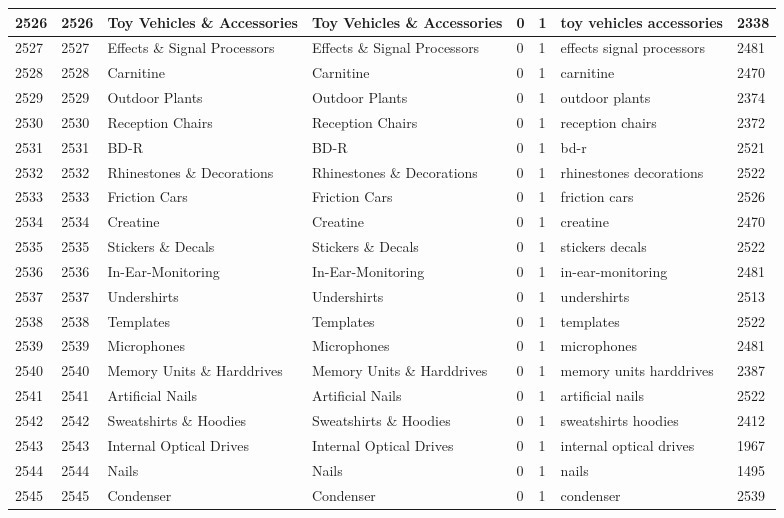 \begin{longtable}{|l|l|l|l|l|l|l|l|}
2526 & 2526 & Toy Vehicles \& Accessories & Toy Vehicles \& Accessories & 0 & 1 & toy vehicles accessories & 2338 \\ \hline 
2527 & 2527 & Effects \& Signal Processors & Effects \& Signal Processors & 0 & 1 & effects signal processors & 2481 \\ \hline 
2528 & 2528 & Carnitine & Carnitine & 0 & 1 & carnitine & 2470 \\ \hline 
2529 & 2529 & Outdoor Plants & Outdoor Plants & 0 & 1 & outdoor plants & 2374 \\ \hline 
2530 & 2530 & Reception Chairs & Reception Chairs & 0 & 1 & reception chairs & 2372 \\ \hline 
2531 & 2531 & BD-R & BD-R & 0 & 1 & bd-r & 2521 \\ \hline 
2532 & 2532 & Rhinestones \& Decorations & Rhinestones \& Decorations & 0 & 1 & rhinestones decorations & 2522 \\ \hline 
2533 & 2533 & Friction Cars & Friction Cars & 0 & 1 & friction cars & 2526 \\ \hline 
2534 & 2534 & Creatine & Creatine & 0 & 1 & creatine & 2470 \\ \hline 
2535 & 2535 & Stickers \& Decals & Stickers \& Decals & 0 & 1 & stickers decals & 2522 \\ \hline 
2536 & 2536 & In-Ear-Monitoring & In-Ear-Monitoring & 0 & 1 & in-ear-monitoring & 2481 \\ \hline 
2537 & 2537 & Undershirts & Undershirts & 0 & 1 & undershirts & 2513 \\ \hline 
2538 & 2538 & Templates & Templates & 0 & 1 & templates & 2522 \\ \hline 
2539 & 2539 & Microphones & Microphones & 0 & 1 & microphones & 2481 \\ \hline 
2540 & 2540 & Memory Units \& Harddrives & Memory Units \& Harddrives & 0 & 1 & memory units harddrives & 2387 \\ \hline 
2541 & 2541 & Artificial Nails & Artificial Nails & 0 & 1 & artificial nails & 2522 \\ \hline 
2542 & 2542 & Sweatshirts \& Hoodies & Sweatshirts \& Hoodies & 0 & 1 & sweatshirts hoodies & 2412 \\ \hline 
2543 & 2543 & Internal Optical Drives & Internal Optical Drives & 0 & 1 & internal optical drives & 1967 \\ \hline 
2544 & 2544 & Nails & Nails & 0 & 1 & nails & 1495 \\ \hline 
2545 & 2545 & Condenser & Condenser & 0 & 1 & condenser & 2539 \\ \hline 

\end{longtable}
